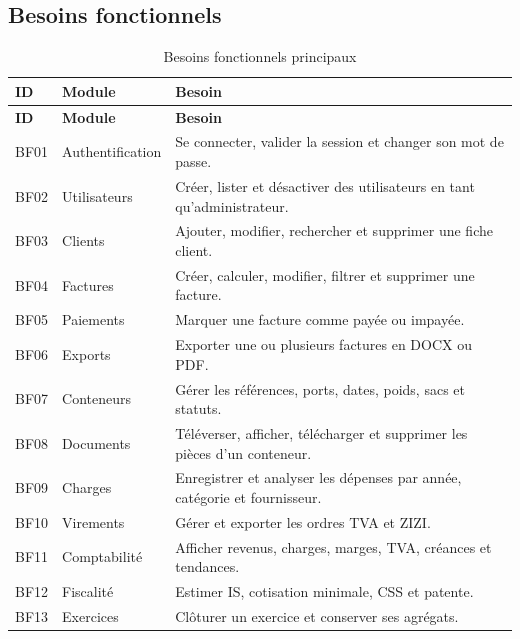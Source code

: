 \documentclass[12pt,a4paper,oneside]{report}
\begin{document}
\subsection{Besoins fonctionnels}
\begin{longtable}{p{2cm}p{4cm}p{8cm}}
\caption{Besoins fonctionnels principaux}\label{tab:bf}\\
\toprule \textbf{ID} & \textbf{Module} & \textbf{Besoin}\\ \midrule
\endfirsthead
\toprule \textbf{ID} & \textbf{Module} & \textbf{Besoin}\\ \midrule
\endhead
BF01 & Authentification & Se connecter, valider la session et changer son mot de passe.\\
BF02 & Utilisateurs & Créer, lister et désactiver des utilisateurs en tant qu'administrateur.\\
BF03 & Clients & Ajouter, modifier, rechercher et supprimer une fiche client.\\
BF04 & Factures & Créer, calculer, modifier, filtrer et supprimer une facture.\\
BF05 & Paiements & Marquer une facture comme payée ou impayée.\\
BF06 & Exports & Exporter une ou plusieurs factures en DOCX ou PDF.\\
BF07 & Conteneurs & Gérer les références, ports, dates, poids, sacs et statuts.\\
BF08 & Documents & Téléverser, afficher, télécharger et supprimer les pièces d'un conteneur.\\
BF09 & Charges & Enregistrer et analyser les dépenses par année, catégorie et fournisseur.\\
BF10 & Virements & Gérer et exporter les ordres TVA et ZIZI.\\
BF11 & Comptabilité & Afficher revenus, charges, marges, TVA, créances et tendances.\\
BF12 & Fiscalité & Estimer IS, cotisation minimale, CSS et patente.\\
BF13 & Exercices & Clôturer un exercice et conserver ses agrégats.\\
\bottomrule
\end{longtable}
\end{document}
